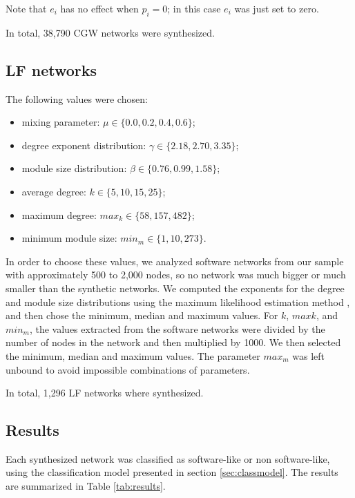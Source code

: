 Note that $e_i$ has no effect when $p_i = 0$; in this case $e_i$ was just set to
zero.

In total, 38,790 CGW networks were synthesized.

\subsection{LF networks}

The following values were chosen:

\begin{itemize}
  \item mixing parameter: $\mu \in \{0.0, 0.2, 0.4, 0.6\}$;
  \item degree exponent distribution: $\gamma \in \{2.18, 2.70, 3.35\}$;
  \item module size distribution: $\beta \in \{0.76, 0.99, 1.58\}$;
  \item average degree: $k \in \{5, 10, 15, 25\}$;
  \item maximum degree: $max_k \in \{58, 157, 482\}$;
  \item minimum module size: $min_m \in \{1, 10, 273\}$.
\end{itemize}

In order to choose these values, we analyzed software networks from our sample
with approximately 500 to 2,000 nodes, so no network was much bigger or much
smaller than the synthetic networks. We computed the exponents for the degree
and module size distributions using the maximum likelihood estimation method
\cite{Clauset2007}, and then chose the minimum, median and maximum values. For
$k$, $maxk$, and $min_m$, the values extracted from the software networks were
divided by the number of nodes in the network and then multiplied by 1000. We
then selected the minimum, median and maximum values. The parameter $max_m$ was
left unbound to avoid impossible combinations of parameters.

In total, 1,296 LF networks where synthesized.

\subsection{Results}

Each synthesized network was classified as software-like or non software-like,
using the classification model presented in section \ref{sec:classmodel}. The
results are summarized in Table \ref{tab:results}. 

